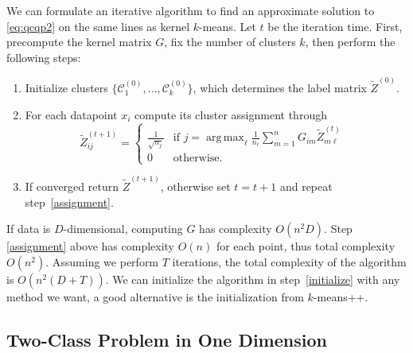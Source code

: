 \documentclass{article}
\DeclareMathOperator*{\argmax}{arg\,max}
\newcommand\C{{\mathcal{C}}}
\newcommand\Zt{\widetilde{Z}}
\begin{document}
We can formulate an iterative algorithm to find
an approximate solution to \eqref{eq:qcqp2} on the same lines
as kernel $k$-means.
Let $t$ be the iteration time. First, precompute the kernel
matrix $G$, fix the number of clusters $k$, then
perform the following steps:
\begin{enumerate}
\item \label{initialize} 
Initialize clusters $\{ \C_1^{(0)},\dotsc,\C_k^{(0)} \}$, which
determines the label matrix $\Zt^{(0)}$.
\item \label{assignment} For each datapoint $x_i$ compute
its cluster assignment through
\begin{equation}
\label{eq:algo}
\Zt^{(t+1)}_{ij} = 
\begin{cases}
\tfrac{1}{\sqrt{n_j}} & \mbox{if $j = \argmax_\ell \tfrac{1}{n_\ell} 
\sum_{m=1}^n G_{i m} \Zt^{(t)}_{m\ell}$ } \\
0 & \mbox{otherwise.}
\end{cases}
\end{equation}
\item If converged return $\Zt^{(t+1)}$, otherwise
set $t = t+1$ and repeat step~\ref{assignment}.
\end{enumerate}
If data is $D$-dimensional, computing $G$ has complexity
$O(n^2 D)$. Step \ref{assignment} above has complexity $O(n)$ for
each point, thus total complexity $O(n^2)$. Assuming we perform $T$ 
iterations,
the total complexity of the algorithm is $O(n^2(D + T))$.
We can initialize the algorithm in step~\ref{initialize} with any method
we want, a good alternative is the initialization from $k$-means++.

\subsection{Two-Class Problem in One Dimension}
\end{document}
